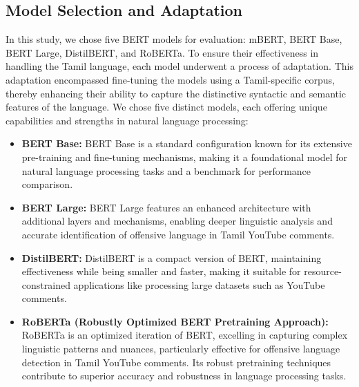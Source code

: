 \documentclass{svproc}
\begin{document}
\subsection{Model Selection and Adaptation}

In this study, we chose five BERT models for evaluation: mBERT, BERT Base, BERT Large, DistilBERT, and RoBERTa. To ensure their effectiveness in handling the Tamil language, each model underwent a process of adaptation. This adaptation encompassed fine-tuning the models using a Tamil-specific corpus, thereby enhancing their ability to capture the distinctive syntactic and semantic features of the language.
We chose five distinct models, each offering unique capabilities and strengths in natural language processing:
\begin{itemize}
\item \textbf{BERT Base:} BERT Base is a standard configuration known for its extensive pre-training and fine-tuning mechanisms, making it a foundational model for natural language processing tasks and a benchmark for performance comparison.

\item \textbf{BERT Large:} BERT Large features an enhanced architecture with additional layers and mechanisms, enabling deeper linguistic analysis and accurate identification of offensive language in Tamil YouTube comments.

\item \textbf{DistilBERT:} DistilBERT is a compact version of BERT, maintaining effectiveness while being smaller and faster, making it suitable for resource-constrained applications like processing large datasets such as YouTube comments.

\item \textbf{RoBERTa (Robustly Optimized BERT Pretraining Approach):} RoBERTa is an optimized iteration of BERT, excelling in capturing complex linguistic patterns and nuances, particularly effective for offensive language detection in Tamil YouTube comments. Its robust pretraining techniques contribute to superior accuracy and robustness in language processing tasks.

\end{itemize}
\end{document}
